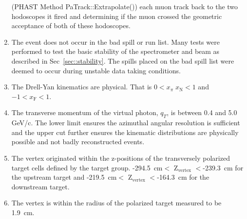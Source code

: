 \begin{enumerate}
  (PHAST Method PaTrack::Extrapolate()) each muon track back to the two
  hodoscopes it fired and determining if the muon crossed the geometric
  acceptance of both of these hodoscopes.
\item The event does not occur in the bad spill or run list.  Many tests were
  performed to test the basic stability of the spectrometer and beam as
  described in Sec~\ref{sec::stability}.  The spills placed on the bad spill
  list were deemed to occur during unstable data taking conditions.
\item The Drell-Yan kinematics are physical.  That is $0 < x_{\pi} \;
  x_{\mathrm{N}} < 1$ and $-1 < x_{\mathrm{F}} < 1$.
\item The transverse momentum of the virtual photon, $q_T$, is between 0.4 and
  5.0 GeV/c.  The lower limit ensures the azimuthal angular resolution is
  sufficient and the upper cut further ensures the kinematic distributions are
  physically possible and not badly reconstructed events.
\item The vertex originated within the z-positions of the transversely polarized
  target cells defined by the target group.  -294.5~cm$<$ Z$_{\mathrm{vertex}}$
  $<$-239.3~cm for the upstream target and -219.5~cm$<$ Z$_{\mathrm{vertex}}$
  $<$-164.3~cm for the downstream target.
\item The vertex is within the radius of the polarized target measured to be
  1.9~cm.
\end{enumerate}

